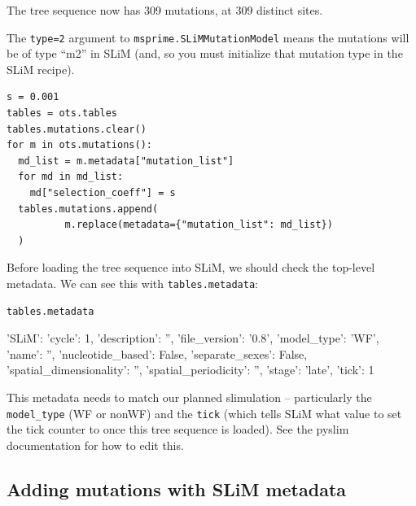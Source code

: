 \documentclass[12pt]{article}
\begin{document}
\begin{pycon}
The tree sequence now has 309 mutations, at 309 distinct sites.
\end{pycon}
The \verb|type=2| argument to \verb|msprime.SLiMMutationModel|
means the mutations will be of type ``m2'' in SLiM
(and, so you must initialize that mutation type in the SLiM recipe).

\begin{verbatim}
s = 0.001
tables = ots.tables
tables.mutations.clear()
for m in ots.mutations():
  md_list = m.metadata["mutation_list"]
  for md in md_list:
    md["selection_coeff"] = s
  tables.mutations.append(
          m.replace(metadata={"mutation_list": md_list})
  )
\end{verbatim}

Before loading the tree sequence into SLiM,
we should check the top-level metadata.
We can see this with \verb|tables.metadata|:
\begin{verbatim}
tables.metadata
\end{verbatim}

\begin{pycon}
{
    'SLiM': {
        'cycle': 1, 
        'description': '', 
        'file_version': '0.8', 
        'model_type': 'WF', 
        'name': '', 
        'nucleotide_based': False, 
        'separate_sexes': False, 
        'spatial_dimensionality': '', 
        'spatial_periodicity': '', 
        'stage': 'late', 
        'tick': 1
        }
}
\end{pycon}
This metadata needs to match our planned slimulation --
particularly the \verb|model_type| (WF or nonWF) and the \verb|tick|
(which tells SLiM what value to set the tick counter to once this tree sequence is loaded).
See the pyslim documentation for how to edit this.

\subsection*{Adding mutations with SLiM metadata}
\end{document}
